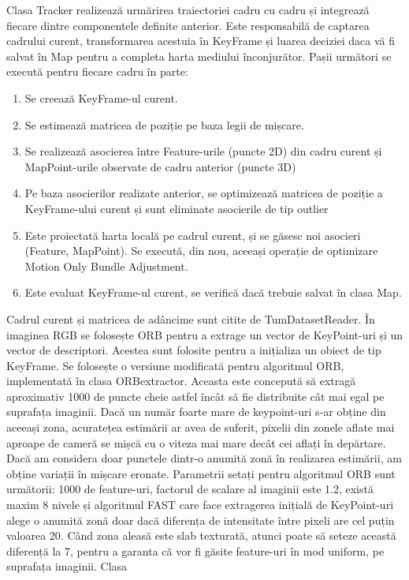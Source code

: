 \documentclass[12pt,a4paper]{report}
\begin{document}
Clasa Tracker realizează urmărirea traiectoriei cadru cu cadru și integrează 
fiecare dintre componentele definite anterior. Este responsabilă de captarea cadrului curent,
transformarea acestuia în KeyFrame și luarea deciziei daca vă fi salvat în Map pentru a completa 
harta mediului înconjurător. Pașii următori se execută pentru fiecare cadru în parte:
\begin{enumerate}
    \item Se creează KeyFrame-ul curent.
    \item Se estimează matricea de poziție pe baza legii de mișcare.
    \item Se realizează asocierea între Feature-urile (puncte 2D) din cadru curent și 
MapPoint-urile observate de cadru anterior (puncte 3D)
    \item Pe baza asocierilor realizate anterior, se optimizează matricea de poziție
a KeyFrame-ului curent și sunt eliminate asocierile de tip outlier
    \item Este proiectată harta locală pe cadrul curent, și se găsesc noi asocieri 
(Feature, MapPoint). Se execută, din nou, aceeași operație de optimizare Motion Only Bundle Adjustment.
    \item Este evaluat KeyFrame-ul curent, se verifică dacă trebuie salvat în clasa Map. 
\end{enumerate}
Cadrul curent și matricea de adâncime sunt citite de TumDatasetReader. În imaginea RGB 
se folosește ORB pentru a extrage un vector de KeyPoint-uri și un vector de descriptori. 
Acestea sunt folosite pentru a inițializa un obiect de tip KeyFrame. Se 
folosește o versiune modificată pentru algoritmul ORB, implementată în clasa ORBextractor. Aceasta 
este concepută să extragă aproximativ 1000 de puncte cheie astfel încât să fie distribuite cât mai egal pe suprafața imaginii. 
Dacă un număr foarte mare de keypoint-uri s-ar obține din aceeași zona, acuratețea estimării ar 
avea de suferit, pixelii din zonele aflate mai aproape de cameră se mișcă cu o viteza mai mare 
decât cei aflați în depărtare. Dacă am considera doar punctele dintr-o anumită zonă în realizarea
estimării, am obține variații în mișcare eronate. Parametrii setați pentru algoritmul ORB sunt următorii: 
1000 de feature-uri, factorul de scalare al imaginii este 1.2, există maxim 8 nivele și algoritmul FAST care face 
extragerea inițială de KeyPoint-uri alege o anumită  zonă doar dacă diferența de intensitate
între pixeli are cel puțin valoarea 20. Când zona aleasă este slab texturată, atunci poate să seteze
această diferență la 7, pentru a garanta că vor fi găsite feature-uri în mod uniform, pe suprafața imaginii.  Clasa 
\end{document}
